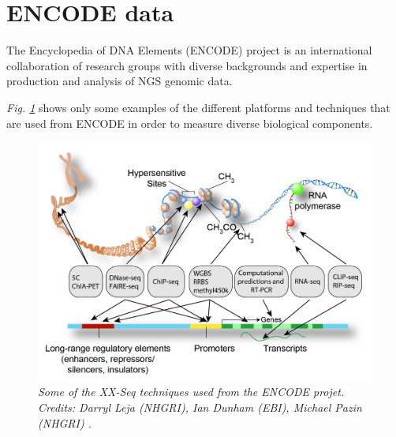 \section{ENCODE data} \label{encode-data-sect}
The Encyclopedia of DNA Elements (ENCODE) project is an international collaboration of research groups with diverse backgrounds and expertise in production and analysis of NGS genomic data.

\emph{Fig. \ref{seq-pic}} shows only some examples of the different platforms and techniques that are used from ENCODE in order to measure diverse biological components.

\begin{figure}[!ht]
\begin{center}
 \includegraphics[scale = 0.25]{images/encode-seq.png}
\caption{\emph{Some of the XX-Seq techniques used from the ENCODE projet. Credits: Darryl Leja (NHGRI), Ian Dunham (EBI), Michael Pazin (NHGRI) \citep{Dunham2012}.}}
\label{seq-pic}
\end{center}
\end{figure} 